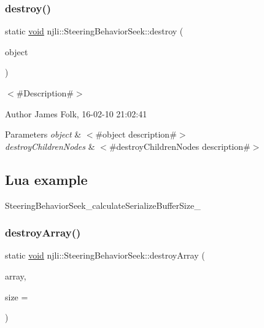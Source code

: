 \subsubsection{\texorpdfstring{destroy()}{destroy()}}
{\footnotesize\ttfamily static \mbox{\hyperlink{_thread_8h_af1e856da2e658414cb2456cb6f7ebc66}{void}} njli\+::\+Steering\+Behavior\+Seek\+::destroy (\begin{DoxyParamCaption}\item[{\mbox{\hyperlink{classnjli_1_1_steering_behavior_seek}{Steering\+Behavior\+Seek}} $\ast$}]{object }\end{DoxyParamCaption})\hspace{0.3cm}{\ttfamily [static]}}



$<$\#\+Description\#$>$ 

\begin{DoxyAuthor}{Author}
James Folk, 16-\/02-\/10 21\+:02\+:41
\end{DoxyAuthor}

\begin{DoxyParams}{Parameters}
{\em object} & $<$\#object description\#$>$ \\
\hline
{\em destroy\+Children\+Nodes} & $<$\#destroy\+Children\+Nodes description\#$>$\\
\hline
\end{DoxyParams}
\hypertarget{classnjli_1_1_steering_behavior_wander_ex1}{}\subsection{Lua example}\label{classnjli_1_1_steering_behavior_wander_ex1}

\begin{DoxyCodeInclude}
\end{DoxyCodeInclude}
Steering\+Behavior\+Seek\+\_\+calculate\+Serialize\+Buffer\+Size\+\_\+ \mbox{\label{classnjli_1_1_steering_behavior_seek_a3a1aee136c7396be018e2a59a53aa300}} 
\subsubsection{\texorpdfstring{destroy\+Array()}{destroyArray()}}
{\footnotesize\ttfamily static \mbox{\hyperlink{_thread_8h_af1e856da2e658414cb2456cb6f7ebc66}{void}} njli\+::\+Steering\+Behavior\+Seek\+::destroy\+Array (\begin{DoxyParamCaption}\item[{\mbox{\hyperlink{classnjli_1_1_steering_behavior_seek}{Steering\+Behavior\+Seek}} $\ast$$\ast$}]{array,  }\item[{const \mbox{\hyperlink{_util_8h_a10e94b422ef0c20dcdec20d31a1f5049}{u32}}}]{size = {} }\end{DoxyParamCaption})\hspace{0.3cm}{\ttfamily [static]}}



